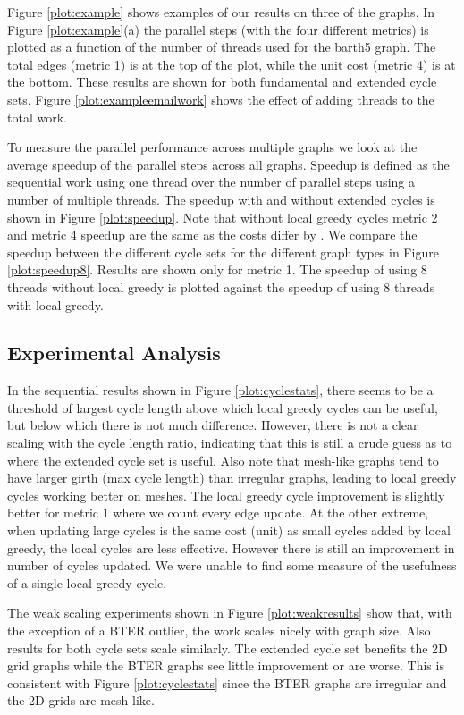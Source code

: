 \documentclass{sig-alternate}
\begin{document}
Figure \ref{plot:example} shows
examples of our results on three of the graphs.
In Figure \ref{plot:example}(a)
the parallel steps
(with the four different metrics) is plotted as a
function of the number of threads
used for the barth5 graph. The total edges (metric 1) is at the
top of the plot, while the unit cost (metric 4) is at the bottom.
These results are shown for both fundamental and extended cycle sets.
Figure \ref{plot:exampleemailwork}
shows the effect of adding threads to the total work.

To measure the parallel performance across multiple graphs
we look at the average speedup of
the parallel steps across all graphs.
Speedup is defined as the sequential work using one thread over the
number of parallel steps using a number of multiple threads.
The speedup with and without extended cycles is shown in
Figure \ref{plot:speedup}. Note that without local greedy cycles
metric 2 and metric 4
speedup are the same as the costs differ by .
We compare the speedup between the different cycle sets
for the different graph types in Figure \ref{plot:speedup8}.
Results are shown only for metric 1.
The speedup of using 8 threads without local greedy is plotted
against the speedup of using 8 threads with local greedy.

\subsection{Experimental Analysis}
In the sequential results shown in Figure \ref{plot:cyclestats},
there seems to be a threshold of largest cycle length above
which local greedy cycles can be useful,
but below which there is not much difference.
However, there is not a clear scaling with the cycle length ratio,
indicating that this is still a crude guess as to where
the extended cycle set is useful.
Also note that mesh-like graphs
tend to have larger girth (max cycle length) than
irregular graphs, leading to local greedy cycles working better on meshes.
The local greedy cycle improvement is slightly better for metric 1
where we count every edge update.
At the other extreme, when updating large cycles is the same cost (unit)
as small cycles added by local greedy, the local cycles are less effective.
However there is still an improvement in number of cycles updated.
We were unable to find some measure of
the usefulness of a single local greedy cycle.

The weak scaling experiments shown in Figure \ref{plot:weakresults}
show that, with the exception of a BTER outlier, the work scales nicely
with graph size. Also results for both cycle sets scale similarly.
The extended cycle set benefits the 2D grid graphs while
the BTER graphs see little improvement or are worse.
This is consistent with Figure \ref{plot:cyclestats} since the BTER
graphs are irregular and the 2D grids are mesh-like.
\end{document}

